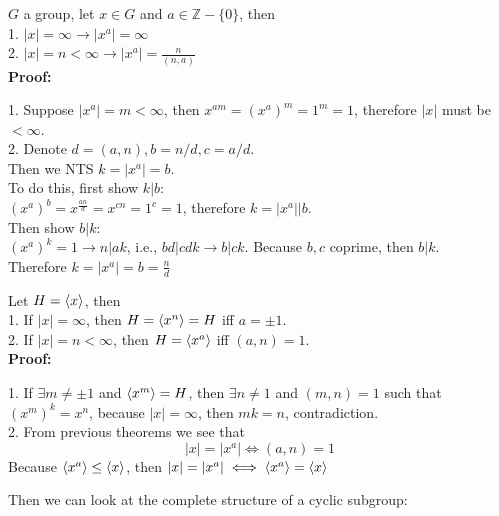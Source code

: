 \documentclass{article}
\begin{document}
$G$ a group, let $x \in G$ and $a \in \mathbb{Z} - \{0\}$, then\\
1. $|x| = \infty \rightarrow |x^a| = \infty$\\
2. $|x| = n < \infty \rightarrow |x^a| = \frac{n}{(n,a)}$\\
\textbf{Proof:}
\begin{addmargin}[1em]{0em}
1. Suppose $|x^a| = m < \infty$, then $x^{am} = (x^a)^m = 1^m = 1$, therefore $|x|$ must be $< \infty$.\\
2. Denote $d = (a, n), b = n/d, c = a/d$.\\
Then we NTS $k = |x^a| = b$.\\
To do this, first show $k | b$:\\
$(x^a)^b = x^{\frac{an}{d}} = x^{c n} = 1^c = 1$, therefore $k = |x^a| | b$.\\
Then show $b | k$:\\
$(x^a)^k = 1 \rightarrow n | ak$, i.e., $bd | cdk \rightarrow b | ck$. Because $b, c$ coprime, then $b | k$.\\
Therefore $k = |x^a| = b = \frac{n}{d}$
\end{addmargin}
Let $H = \braket{x}$, then\\
1. If $|x| = \infty$, then $H = \braket{x^n} = H$ iff $a = \pm 1$.\\
2. If $|x| = n < \infty$, then $H = \braket{x^a}$ iff $(a,n) = 1$.\\
\textbf{Proof:}
\begin{addmargin}[1em]{0em}
1. If $\exists m \neq \pm 1$ and $\braket{x^m} = H$, then $\exists n \neq 1$ and $(m, n) = 1$ such that $(x^m)^k = x^n$, because $|x| = \infty$, then $mk = n$, contradiction.\\
2. From previous theorems we see that
\begin{equation*}
    |x| = |x^a| \iff (a, n) = 1
\end{equation*}
Because $\braket{x^a} \leq \braket{x}$, then $|x| = |x^a| \iff \braket{x^a} = \braket{x}$
\end{addmargin}
Then we can look at the complete structure of a cyclic subgroup:
\end{document}
